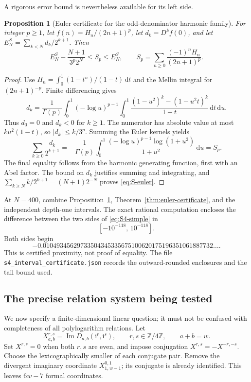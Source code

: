 \documentclass[11pt,a4paper]{article}
\numberwithin{equation}{section}
\newtheorem{proposition}[theorem]{Proposition}
\theoremstyle{definition}
\theoremstyle{remark}
\newcommand{\Imag}{\operatorname{Im}}
\newcommand{\dd}{\,\mathrm{d}}
\newcommand{\ii}{\mathrm{i}}
\begin{document}
A rigorous error bound is nevertheless available for its left side.
\begin{proposition}[Euler certificate for the odd-denominator harmonic family]\label{prop:S-euler}
For integer $p\ge1$, let $f(n)=H_n/(2n+1)^p$, let $d_k=D^kf(0)$, and let $E_N^S=\sum_{k<N}d_k/2^{k+1}$. Then
\begin{equation}\label{eq:S-euler}
 E_N^S-\frac{N+1}{3^p2^N}\le S_p\le E_N^S,
 \qquad S_p=\sum_{n\ge0}\frac{(-1)^nH_n}{(2n+1)^p}.
\end{equation}
\end{proposition}
\begin{proof}
Use $H_n=\int_0^1(1-t^n)/(1-t)\dd t$ and the Mellin integral for $(2n+1)^{-p}$. Finite differencing gives
\[
 d_k=\frac1{\Gamma(p)}\int_0^1(-\log u)^{p-1}
  \int_0^1\frac{(1-u^2)^k-(1-u^2t)^k}{1-t}\dd t\dd u.
\]
Thus $d_0=0$ and $d_k<0$ for $k\ge1$. The numerator has absolute value at most $ku^2(1-t)$, so $|d_k|\le k/3^p$. Summing the Euler kernels yields
\[
 \sum_{k\ge0}\frac{d_k}{2^{k+1}}
 =-\frac1{\Gamma(p)}\int_0^1
  \frac{(-\log u)^{p-1}\log(1+u^2)}{1+u^2}\dd u=S_p.
\]
The final equality follows from the harmonic generating function, first with an Abel factor. The bound on $d_k$ justifies summing and integrating, and
$\sum_{k\ge N}k/2^{k+1}=(N+1)2^{-N}$ proves \eqref{eq:S-euler}.
\end{proof}

At $N=400$, combine Proposition~\ref{prop:S-euler}, Theorem~\ref{thm:euler-certificate}, and the independent depth-one intervals. The exact rational computation encloses the difference between the two sides of \eqref{eq:S4-simple} in
\begin{equation}\label{eq:S4-difference}
 [-10^{-118},\,10^{-118}].
\end{equation}
Both sides begin
\[
 -0.01049345629733504345335675100620175196351061887732\ldots.
\]
This is certified proximity, not proof of equality. The file
\texttt{s4\_interval\_certificate.json} records the outward-rounded enclosures and the tail bound used.

\subsection{The precise relation system being tested}
We now specify a finite-dimensional linear question; it must not be confused with completeness of all polylogarithm relations. Let
\[
 X_{a,b}^{r,s}=\Imag D_{a,b}(\ii^r,\ii^s),\qquad r,s\in\mathbb Z/4\mathbb Z,
 \qquad a+b=w.
\]
Set $X^{r,s}=0$ when both $r,s$ are even, and impose conjugation
$X^{r,s}=-X^{-r,-s}$. Choose the lexicographically smaller of each conjugate pair. Remove the divergent imaginary coordinate $X_{1,w-1}^{0,1}$; its conjugate is already identified. This leaves $6w-7$ formal coordinates.
\end{document}
